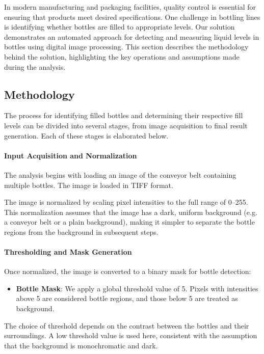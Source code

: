 \documentclass[a4paper,12pt]{article}
\begin{document}
In modern manufacturing and packaging facilities, quality control is essential for ensuring that products meet desired specifications. One challenge in bottling lines is identifying whether bottles are filled to appropriate levels. Our solution demonstrates an automated approach for detecting and measuring liquid levels in bottles using digital image processing. This section describes the methodology behind the solution, highlighting the key operations and assumptions made during the analysis.

\subsection{Methodology}

The process for identifying filled bottles and determining their respective fill levels can be divided into several stages, from image acquisition to final result generation. Each of these stages is elaborated below.

\paragraph{Input Acquisition and Normalization}

The analysis begins with loading an image of the conveyor belt containing multiple bottles. The image is loaded in TIFF format.

The image is normalized by scaling pixel intensities to the full range of 0--255. This normalization assumes that the image has a dark, uniform background (e.g. a conveyor belt or a plain background), making it simpler to separate the bottle regions from the background in subsequent steps.

\paragraph{Thresholding and Mask Generation}

Once normalized, the image is converted to a binary mask for bottle detection:
\begin{itemize}
    \item \textbf{Bottle Mask}: We apply a global threshold value of 5. Pixels with intensities above 5 are considered bottle regions, and those below 5 are treated as background.
\end{itemize}
The choice of threshold depends on the contrast between the bottles and their surroundings. A low threshold value is used here, consistent with the assumption that the background is monochromatic and dark.
\end{document}
